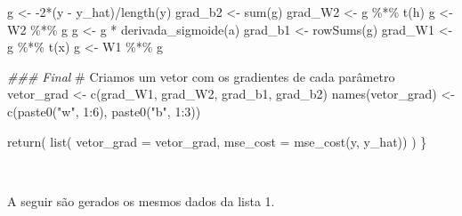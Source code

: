 \documentclass[
  a4paperpaper,
]{article}
\newenvironment{Shaded}{\begin{snugshade}}{\end{snugshade}}
\newcommand{\AttributeTok}[1]{\textcolor[rgb]{0.40,0.45,0.13}{#1}}
\newcommand{\CommentTok}[1]{\textcolor[rgb]{0.37,0.37,0.37}{#1}}
\newcommand{\DecValTok}[1]{\textcolor[rgb]{0.68,0.00,0.00}{#1}}
\newcommand{\DocumentationTok}[1]{\textcolor[rgb]{0.37,0.37,0.37}{\textit{#1}}}
\newcommand{\FunctionTok}[1]{\textcolor[rgb]{0.28,0.35,0.67}{#1}}
\newcommand{\NormalTok}[1]{\textcolor[rgb]{0.00,0.23,0.31}{#1}}
\newcommand{\OtherTok}[1]{\textcolor[rgb]{0.00,0.23,0.31}{#1}}
\newcommand{\SpecialCharTok}[1]{\textcolor[rgb]{0.37,0.37,0.37}{#1}}
\newcommand{\StringTok}[1]{\textcolor[rgb]{0.13,0.47,0.30}{#1}}
\begin{document}
\begin{Shaded}
\begin{Highlighting}[]
\NormalTok{  g }\OtherTok{\textless{}{-}} \SpecialCharTok{{-}}\DecValTok{2}\SpecialCharTok{*}\NormalTok{(y }\SpecialCharTok{{-}}\NormalTok{ y\_hat)}\SpecialCharTok{/}\FunctionTok{length}\NormalTok{(y)}
\NormalTok{  grad\_b2 }\OtherTok{\textless{}{-}} \FunctionTok{sum}\NormalTok{(g)}
\NormalTok{  grad\_W2 }\OtherTok{\textless{}{-}}\NormalTok{ g }\SpecialCharTok{\%*\%} \FunctionTok{t}\NormalTok{(h)}
\NormalTok{  g }\OtherTok{\textless{}{-}}\NormalTok{ W2 }\SpecialCharTok{\%*\%}\NormalTok{ g}
\NormalTok{  g }\OtherTok{\textless{}{-}}\NormalTok{ g }\SpecialCharTok{*} \FunctionTok{derivada\_sigmoide}\NormalTok{(a)}
\NormalTok{  grad\_b1 }\OtherTok{\textless{}{-}} \FunctionTok{rowSums}\NormalTok{(g)}
\NormalTok{  grad\_W1 }\OtherTok{\textless{}{-}}\NormalTok{ g }\SpecialCharTok{\%*\%} \FunctionTok{t}\NormalTok{(x)}
\NormalTok{  g }\OtherTok{\textless{}{-}}\NormalTok{ W1 }\SpecialCharTok{\%*\%}\NormalTok{ g}
  
  \DocumentationTok{\#\#\# Final}
  \CommentTok{\# Criamos um vetor com os gradientes de cada parâmetro}
\NormalTok{  vetor\_grad }\OtherTok{\textless{}{-}} \FunctionTok{c}\NormalTok{(grad\_W1, grad\_W2, grad\_b1, grad\_b2)}
  \FunctionTok{names}\NormalTok{(vetor\_grad) }\OtherTok{\textless{}{-}} \FunctionTok{c}\NormalTok{(}\FunctionTok{paste0}\NormalTok{(}\StringTok{"w"}\NormalTok{, }\DecValTok{1}\SpecialCharTok{:}\DecValTok{6}\NormalTok{), }\FunctionTok{paste0}\NormalTok{(}\StringTok{"b"}\NormalTok{, }\DecValTok{1}\SpecialCharTok{:}\DecValTok{3}\NormalTok{))}
  
  \FunctionTok{return}\NormalTok{(}
    \FunctionTok{list}\NormalTok{(}
      \AttributeTok{vetor\_grad =}\NormalTok{ vetor\_grad,}
      \AttributeTok{mse\_cost =} \FunctionTok{mse\_cost}\NormalTok{(y, y\_hat))}
\NormalTok{    )}
\NormalTok{\}}
\end{Highlighting}
\end{Shaded}

~

A seguir são gerados os mesmos dados da lista 1.

~
\end{document}
